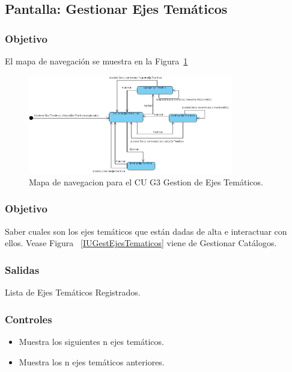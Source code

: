 \subsection{Pantalla: Gestionar Ejes Temáticos}

\subsubsection{Objetivo}
	El mapa de navegación se muestra en la Figura~\ref{fig:mapaNavegacionCUG3}

   \begin{figure}[hbpt!]
 		\centering
 			\includegraphics[width=0.8\textwidth]{images/CUG3/MapaNavegacion.jpg}
 		\caption{Mapa de navegacion para el CU G3 Gestion de Ejes Temáticos.}
		\label{fig:mapaNavegacionCUG3}
 	\end{figure}


\subsubsection{Objetivo}
Saber cuales son los ejes temáticos que están dadas de alta e interactuar con ellos. Vease Figura ~\ref{IUGestEjesTematicos} viene de Gestionar Catálogos.


\subsubsection{Salidas}
Lista de Ejes Temáticos Registrados.

\subsubsection{Controles}
\begin{itemize}
 \item {} Muestra los siguientes n ejes temáticos.
 \item {} Muestra los n ejes temáticos anteriores.
\end{itemize}

